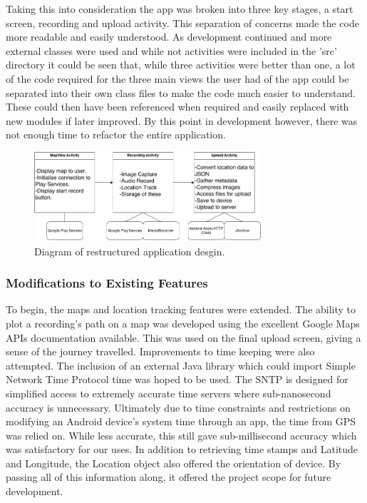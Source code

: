 \documentclass{l3proj}
\begin{document}
Taking this into consideration the app was broken into three key stages, a start screen, recording and upload activity. This separation of concerns made the code more readable and easily understood. As development continued and more external classes were used and while not activities were included in the 'src' directory it could be seen that, while three activities were better than one, a lot of the code required for the three main views the user had of the app could be separated into their own class files to make the code much easier to understand. These could then have been referenced when required and easily replaced with new modules if later improved. By this point in development however, there was not enough time to refactor the entire application.

\begin{figure}[ht!]
\centering
\includegraphics[width=0.75\textwidth]{images/android-app-structure.png}
\caption{Diagram of restructured application desgin.}
\end{figure}

\subsubsection{Modifications to Existing Features}
To begin, the maps and location tracking features were extended. The ability to plot a recording's path on a map was developed using the excellent Google Maps APIs documentation available. This was used on the final upload screen, giving a sense of the journey travelled. Improvements to time keeping were also attempted. The inclusion of an external Java library which could import Simple Network Time Protocol time was hoped to be used. The SNTP is designed for simplified access to extremely accurate time servers where sub-nanosecond accuracy is unnecessary. Ultimately due to time constraints and restrictions on modifying an Android device's system time through an app, the time from GPS was relied on. While less accurate, this still gave sub-millisecond accuracy which was satisfactory for our uses. In addition to retrieving time stamps and Latitude and Longitude, the Location object also offered the orientation of device. By passing all of this information along, it offered the project scope for future development.
\end{document}
